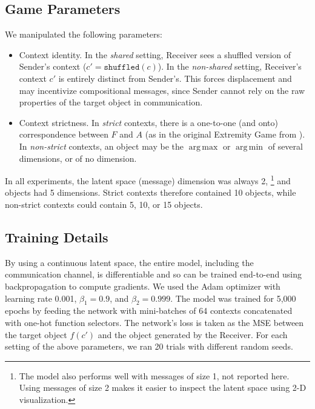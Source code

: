 \documentclass[11pt,a4paper]{article}
\DeclareMathOperator*{\argmax}{arg\,max}
\DeclareMathOperator*{\argmin}{arg\,min}
\newcommand{\changeEC}[2]{{\leavevmode\color{gray}{\scriptsize{#1}}~\color{blue}#2}}
\newcommand{\nbEC}[1]{{\leavevmode\color{blue}{\scriptsize#1}}}
\begin{document}
\subsection{Game Parameters}

We manipulated the following parameters:
\begin{itemize}[noitemsep]
	\item Context identity. 
	In the \emph{shared} setting, Receiver sees a shuffled version of Sender's context ($c' = \texttt{shuffled}(c)$). In the \emph{non-shared} setting, Receiver's context $c'$ is entirely distinct from Sender's. This forces displacement and may incentivize compositional messages, since Sender cannot rely on the raw properties of the target object in communication.

	\item Context strictness. 
	In \emph{strict} contexts, there is a one-to-one (and onto) correspondence between $F$ and $A$ (as in the original Extremity Game from \citealp{Steinert-Threlkeld2019}). 
In \emph{non-strict} contexts, an object may be the $\argmax$ or $\argmin$ of several dimensions, or of no dimension.

\end{itemize}
In all experiments, the latent space (message) dimension was always 2,%
\footnote{The model also performs well with messages of size 1, not reported here. Using messages of size 2 makes it easier to inspect the latent space using 2-D visualization.}
and objects had 5 dimensions. Strict contexts therefore contained 10 objects, while non-strict contexts could contain 5, 10, or 15 objects.

\subsection{Training Details}

By using a continuous latent space, the entire model, including the communication channel, is differentiable and so can be trained end-to-end using backpropagation to compute gradients.
\nbEC{We can drop the previous sentence if we need space.}
We used the Adam optimizer \citep{Kingma2015} with learning rate 0.001, $\beta_1 = 0.9$, and $\beta_2 = 0.999$. The model was trained for 5,000 epochs by feeding the network with mini-batches of 64 contexts concatenated with one-hot function selectors. The network's loss is taken as the MSE between the target object $f(c')$ and the object generated by the Receiver. For each setting of the above parameters, we ran 20 trials with different random seeds.
\end{document}
